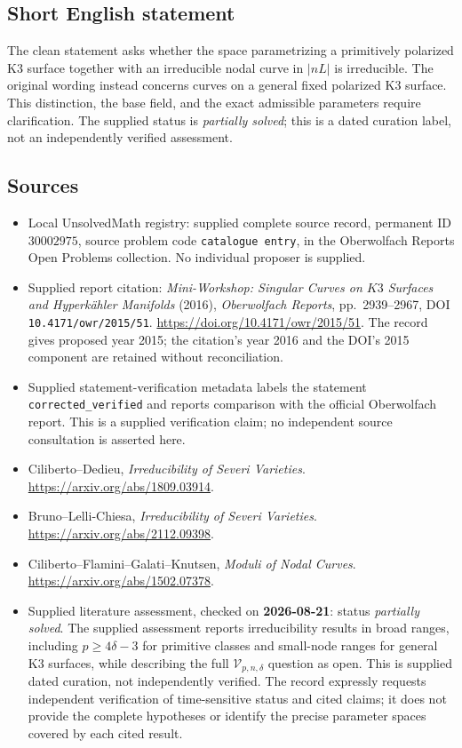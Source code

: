 \documentclass[11pt]{article}
\begin{document}
\subsection{Short English statement}
The clean statement asks whether the space parametrizing a primitively polarized K3 surface together with an irreducible nodal curve in \(|nL|\) is irreducible. The original wording instead concerns curves on a general fixed polarized K3 surface. This distinction, the base field, and the exact admissible parameters require clarification. The supplied status is \emph{partially solved}; this is a dated curation label, not an independently verified assessment.
\subsection{Sources}
\begin{itemize}
\item Local UnsolvedMath registry: supplied complete source record, permanent ID \(30002975\), source problem code \texttt{catalogue entry}, in the Oberwolfach Reports Open Problems collection. No individual proposer is supplied.
\item Supplied report citation: \emph{Mini-Workshop: Singular Curves on \(K3\) Surfaces and Hyperk\"ahler Manifolds} (2016), \emph{Oberwolfach Reports}, pp.\ 2939--2967, DOI \texttt{10.4171/owr/2015/51}. \url{https://doi.org/10.4171/owr/2015/51}. The record gives proposed year 2015; the citation's year 2016 and the DOI's 2015 component are retained without reconciliation.
\item Supplied statement-verification metadata labels the statement \texttt{corrected\_verified} and reports comparison with the official Oberwolfach report. This is a supplied verification claim; no independent source consultation is asserted here.
\item Ciliberto--Dedieu, \emph{Irreducibility of Severi Varieties}. \url{https://arxiv.org/abs/1809.03914}.
\item Bruno--Lelli-Chiesa, \emph{Irreducibility of Severi Varieties}. \url{https://arxiv.org/abs/2112.09398}.
\item Ciliberto--Flamini--Galati--Knutsen, \emph{Moduli of Nodal Curves}. \url{https://arxiv.org/abs/1502.07378}.
\item Supplied literature assessment, checked on \textbf{2026-08-21}: status \emph{partially solved}. The supplied assessment reports irreducibility results in broad ranges, including \(p\geq4\delta-3\) for primitive classes and small-node ranges for general K3 surfaces, while describing the full \(\mathcal V_{p,n,\delta}\) question as open. This is supplied dated curation, not independently verified. The record expressly requests independent verification of time-sensitive status and cited claims; it does not provide the complete hypotheses or identify the precise parameter spaces covered by each cited result.
\end{itemize}
\end{document}
